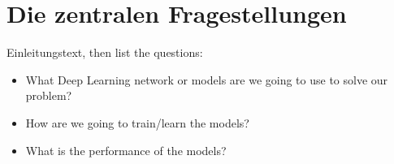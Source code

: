 \section{Die zentralen Fragestellungen}

Einleitungstext, then list the questions:

\begin{itemize}
	\item What Deep Learning network or models are we going to use to solve our problem?
	
	\item How are we going to train/learn the models?
	
	\item What is the performance of the models?
\end{itemize}